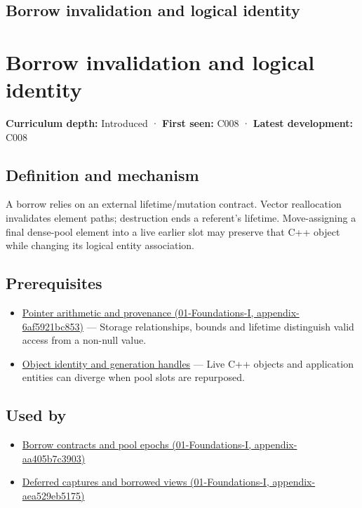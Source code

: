 \hypertarget{appendix-f9b8b9188c7f}{}
\section*{Borrow invalidation and logical identity}
\chapter{Borrow invalidation and logical identity}\label{appendix-f9b8b9188c7f-borrow-invalidation-and-logical-identity}

\textbf{Curriculum depth:} Introduced · \textbf{First seen:} C008 · \textbf{Latest development:} C008

\section{Definition and mechanism}\label{appendix-f9b8b9188c7f-definition-and-mechanism}

A borrow relies on an external lifetime/mutation contract. Vector reallocation invalidates element paths; destruction ends a referent's lifetime. Move-assigning a final dense-pool element into a live earlier slot may preserve that C++ object while changing its logical entity association.

\section{Prerequisites}\label{appendix-f9b8b9188c7f-prerequisites}

\begin{itemize}
\tightlist
\item
  \href{../01-Foundations-I/main.pdf\#nameddest=appendix-6af5921bc853}{Pointer arithmetic and provenance (01-Foundations-I, appendix-6af5921bc853)} --- Storage relationships, bounds and lifetime distinguish valid access from a non-null value.
\item
  \hyperref[appendix-f1581457d322]{Object identity and generation handles} --- Live C++ objects and application entities can diverge when pool slots are repurposed.
\end{itemize}

\section{Used by}\label{appendix-f9b8b9188c7f-used-by}

\begin{itemize}
\tightlist
\item
  \href{../01-Foundations-I/main.pdf\#nameddest=appendix-aa405b7c3903}{Borrow contracts and pool epochs (01-Foundations-I, appendix-aa405b7c3903)}
\item
  \href{../01-Foundations-I/main.pdf\#nameddest=appendix-aea529eb5175}{Deferred captures and borrowed views (01-Foundations-I, appendix-aea529eb5175)}
\end{itemize}

